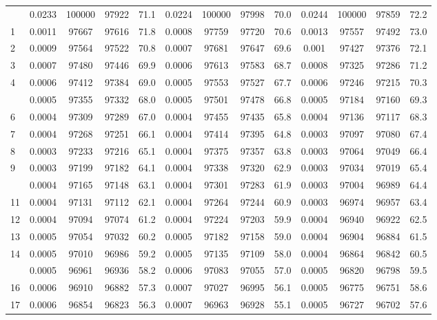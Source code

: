 \documentclass[
  14pt,
]{article}
\begin{document}
\begin{longtable}[t]{lcccccccccccc}
\endfoot
\bottomrule
\endlastfoot
0 & 0.0233 & 100000 & 97922 & 71.1 & 0.0224 & 100000 & 97998 & 70.0 & 0.0244 & 100000 & 97859 & 72.2\\
1 & 0.0011 & 97667 & 97616 & 71.8 & 0.0008 & 97759 & 97720 & 70.6 & 0.0013 & 97557 & 97492 & 73.0\\
2 & 0.0009 & 97564 & 97522 & 70.8 & 0.0007 & 97681 & 97647 & 69.6 & 0.001 & 97427 & 97376 & 72.1\\
3 & 0.0007 & 97480 & 97446 & 69.9 & 0.0006 & 97613 & 97583 & 68.7 & 0.0008 & 97325 & 97286 & 71.2\\
4 & 0.0006 & 97412 & 97384 & 69.0 & 0.0005 & 97553 & 97527 & 67.7 & 0.0006 & 97246 & 97215 & 70.3\\
\addlinespace
5 & 0.0005 & 97355 & 97332 & 68.0 & 0.0005 & 97501 & 97478 & 66.8 & 0.0005 & 97184 & 97160 & 69.3\\
6 & 0.0004 & 97309 & 97289 & 67.0 & 0.0004 & 97455 & 97435 & 65.8 & 0.0004 & 97136 & 97117 & 68.3\\
7 & 0.0004 & 97268 & 97251 & 66.1 & 0.0004 & 97414 & 97395 & 64.8 & 0.0003 & 97097 & 97080 & 67.4\\
8 & 0.0003 & 97233 & 97216 & 65.1 & 0.0004 & 97375 & 97357 & 63.8 & 0.0003 & 97064 & 97049 & 66.4\\
9 & 0.0003 & 97199 & 97182 & 64.1 & 0.0004 & 97338 & 97320 & 62.9 & 0.0003 & 97034 & 97019 & 65.4\\
\addlinespace
10 & 0.0004 & 97165 & 97148 & 63.1 & 0.0004 & 97301 & 97283 & 61.9 & 0.0003 & 97004 & 96989 & 64.4\\
11 & 0.0004 & 97131 & 97112 & 62.1 & 0.0004 & 97264 & 97244 & 60.9 & 0.0003 & 96974 & 96957 & 63.4\\
12 & 0.0004 & 97094 & 97074 & 61.2 & 0.0004 & 97224 & 97203 & 59.9 & 0.0004 & 96940 & 96922 & 62.5\\
13 & 0.0005 & 97054 & 97032 & 60.2 & 0.0005 & 97182 & 97158 & 59.0 & 0.0004 & 96904 & 96884 & 61.5\\
14 & 0.0005 & 97010 & 96986 & 59.2 & 0.0005 & 97135 & 97109 & 58.0 & 0.0004 & 96864 & 96842 & 60.5\\
\addlinespace
15 & 0.0005 & 96961 & 96936 & 58.2 & 0.0006 & 97083 & 97055 & 57.0 & 0.0005 & 96820 & 96798 & 59.5\\
16 & 0.0006 & 96910 & 96882 & 57.3 & 0.0007 & 97027 & 96995 & 56.1 & 0.0005 & 96775 & 96751 & 58.6\\
17 & 0.0006 & 96854 & 96823 & 56.3 & 0.0007 & 96963 & 96928 & 55.1 & 0.0005 & 96727 & 96702 & 57.6\\

\end{longtable}
\end{document}
